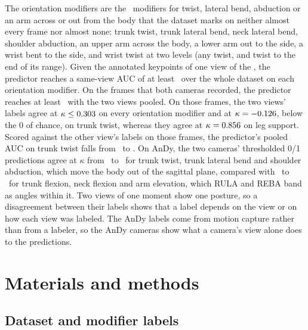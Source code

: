 \documentclass[review,3p,authoryear]{elsarticle}
\begin{document}
The orientation modifiers are the \nOrientModifiers\ modifiers for twist, lateral bend,
abduction or an arm across or out from the body that the dataset marks on neither almost
every frame nor almost none: trunk twist, trunk lateral bend, neck lateral bend, shoulder abduction, an upper arm
across the body, a lower arm out to the side, a wrist bent to the side, and wrist twist at
two levels (any twist, and twist to the end of its range). Given the annotated keypoints of
one view of the \datasetName, the predictor reaches a same-view AUC of at least
\orientMinAuc\ over the whole dataset on each orientation modifier. On the frames that both cameras recorded, the predictor reaches at least
\pairOrientMinAuc\ with the two views pooled. On those frames, the two views' labels agree at
$\kappa\le0.303$ on every orientation modifier and at
$\kappa=-0.126$, below the 0 of chance, on trunk twist, whereas they agree
at $\kappa=0.856$ on leg support. Scored against the other view's labels on
those frames, the predictor's pooled AUC on trunk twist falls from \pairAucTrunkTwist\ to \otherAucTrunkTwist.
On AnDy, the two cameras' thresholded 0/1 predictions agree at $\kappa$ from \andyXviewKappaTrunkLateral\
to \andyXviewKappaArmAbd\ for trunk twist, trunk lateral bend and shoulder abduction,
which move the body out of the sagittal plane, compared with \andyXviewKappaArmElev\ to
\andyXviewKappaTrunkFlexion\ for trunk flexion, neck flexion and arm elevation, which RULA
and REBA band as angles within it. Two views of one moment show one posture, so a
disagreement between their labels shows that a label depends on the view or on how each
view was labeled. The AnDy labels come from motion capture rather than from a labeler, so
the AnDy cameras show what a camera's view alone does to the predictions.

\section{Materials and methods}
\label{sec:methods}

\subsection{Dataset and modifier labels}
\label{sec:data}
\end{document}
